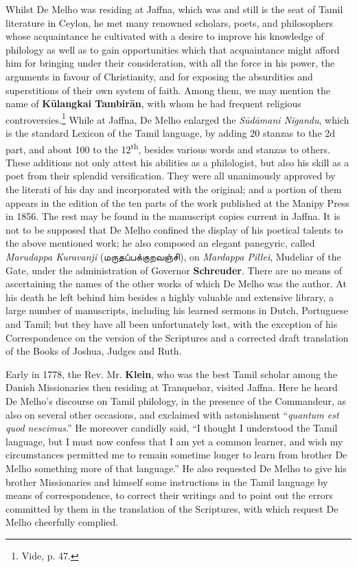 \documentclass{article}
\newcommand{\TamilText}[1]{\texttamil{#1}}
\newcommand{\tam}[1]{\TamilText{#1}}
\begin{document}
Whilst De Melho was residing at Jaffna, which was and still is the seat of Tamil literature in Ceylon, he met many renowned scholars, poets, and philosophers whose acquaintance he cultivated with a desire to improve his knowledge of philology as well as to gain opportunities which that acquaintance might afford him for bringing under their consideration, with all the force in his power, the arguments in favour of Christianity, and for exposing the absurdities and superstitions of their own system of faith. Among them, we may mention the name of \textbf{K\={u}langkai Tambir\={a}n}, with whom he had frequent religious controversies.\footnote{Vide, p. 47.} While at Jaffna, De Melho enlarged the \emph{S\={u}d\={a}mani Nigandu}, which is the standard Lexicon of the Tamil language, by adding 20 stanzas to the 2d part, and about 100 to the 12\textsuperscript{th}, besides various words and stanzas to others. These additions not only attest his abilities as a philologist, but also his skill as a poet from their splendid versification. They were all unanimously approved by the literati of his day and incorporated with the original; and a portion of them appears in the edition of the ten parts of the work published at the Manipy Press in 1856. The rest may be found in the manuscript copies current in Jaffna. It is not to be supposed that De Melho confined the display of his poetical talents to the above mentioned work; he also composed an elegant panegyric, called \emph{Marudappa Kuravanji} (\tam{மருதப்பக்குறவஞ்சி}), on \emph{Mardappa Pillei}, Mudeliar of the Gate, under the administration of Governor \textbf{Schreuder}. There are no means of ascertaining the names of the other works of which De Melho was the author. At his death he left behind him besides a highly valuable and extensive library, a large number of manuscripts, including his learned sermons in Dutch, Portuguese and Tamil; but they have all been unfortunately lost, with the exception of his Correspondence on the version of the Scriptures and a corrected draft translation of the Books of Joshua, Judges and Ruth.

Early in 1778, the Rev. Mr. \textbf{Klein}, who was the best Tamil scholar among the Danish Missionaries then residing at Tranquebar, visited Jaffna. Here he heard De Melho's discourse on Tamil philology, in the presence of the Commandeur, as also on several other occasions, and exclaimed with astonishment ``\emph{quantum est quod nescimus}.'' He moreover candidly said, ``I thought I understood the Tamil language, but I must now confess that I am yet a common learner, and wish my circumstances permitted me to remain sometime longer to learn from brother De Melho something more of that language.'' He also requested De Melho to give his brother Missionaries and himself some instructions in the Tamil language by means of correspondence, to correct their writings and to point out the errors committed by them in the translation of the Scriptures, with which request De Melho cheerfully complied.
\end{document}
